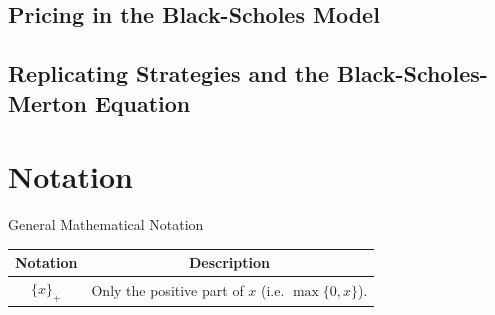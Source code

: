 \documentclass[11pt,a4paper]{article}
\begin{document}
\subsection{Pricing in the Black-Scholes Model}

\subsection{Replicating Strategies and the Black-Scholes-Merton Equation}

\section{Notation}

  \begin{notation}{General Mathematical Notation}
    \begin{tabular}{c|c}
      Notation&Description\\\hline
      $\{x\}_+$&Only the positive part of $x$ (i.e. $\max\{0,x\}$).
    \end{tabular}
  \end{notation}
\end{document}
